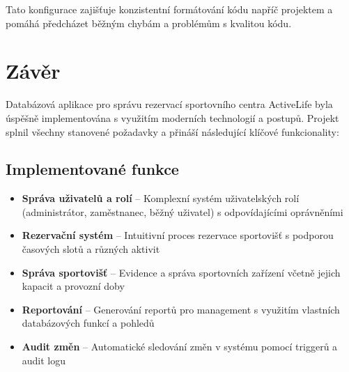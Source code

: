 \documentclass[12pt, a4paper]{article}
\begin{document}
Tato konfigurace zajišťuje konzistentní formátování kódu napříč projektem a pomáhá předcházet běžným chybám a problémům s kvalitou kódu.

\section{Závěr}
\label{sec:zaver}

Databázová aplikace pro správu rezervací sportovního centra ActiveLife byla úspěšně implementována s využitím moderních technologií a postupů. Projekt splnil všechny stanovené požadavky a přináší následující klíčové funkcionality:

\subsection{Implementované funkce}
\begin{itemize}
    \item \textbf{Správa uživatelů a rolí} -- Komplexní systém uživatelských rolí (administrátor, zaměstnanec, běžný uživatel) s odpovídajícími oprávněními
    \item \textbf{Rezervační systém} -- Intuitivní proces rezervace sportovišť s podporou časových slotů a různých aktivit
    \item \textbf{Správa sportovišť} -- Evidence a správa sportovních zařízení včetně jejich kapacit a provozní doby
    \item \textbf{Reportování} -- Generování reportů pro management s využitím vlastních databázových funkcí a pohledů
    \item \textbf{Audit změn} -- Automatické sledování změn v systému pomocí triggerů a audit logu
\end{itemize}
\end{document}
